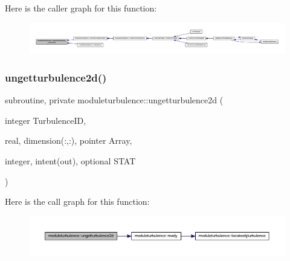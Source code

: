Here is the caller graph for this function\+:\nopagebreak
\begin{figure}[H]
\begin{center}
\leavevmode
\includegraphics[width=350pt]{namespacemoduleturbulence_ab7894e5b2120544a23a97a5dec146823_icgraph}
\end{center}
\end{figure}
\mbox{\label{namespacemoduleturbulence_a036689ae17a2c12c06edbd02b17281c1}} 
\subsubsection{\texorpdfstring{ungetturbulence2d()}{ungetturbulence2d()}}
{\footnotesize\ttfamily subroutine, private moduleturbulence\+::ungetturbulence2d (\begin{DoxyParamCaption}\item[{integer}]{Turbulence\+ID,  }\item[{real, dimension(\+:,\+:), pointer}]{Array,  }\item[{integer, intent(out), optional}]{S\+T\+AT }\end{DoxyParamCaption})\hspace{0.3cm}{\ttfamily [private]}}

Here is the call graph for this function\+:\nopagebreak
\begin{figure}[H]
\begin{center}
\leavevmode
\includegraphics[width=350pt]{namespacemoduleturbulence_a036689ae17a2c12c06edbd02b17281c1_cgraph}
\end{center}
\end{figure}
\mbox{\label{namespacemoduleturbulence_a3efe4fb95ca7fe2eff42a33023683bd8}} 

